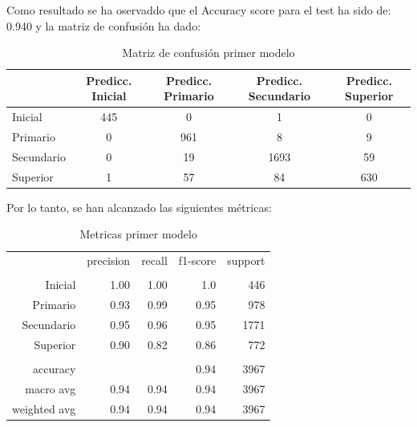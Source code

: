 \documentclass[a4paper]{article}
\begin{document}
            Como resultado se ha oservaddo que el Accuracy score para el test ha sido de: 0.940 y la matriz de confusión ha dado:
            \begin{table}[H]
                \centering
                \begin{tabular}{|l|c|c|c|c|}
                \hline
                    ~ & Predicc. Inicial & Predicc. Primario & Predicc. Secundario & Predicc. Superior \\ \hline
                    Inicial & 445 & 0 & 1 & 0 \\ \hline
                    Primario & 0 & 961 & 8 & 9 \\ \hline
                    Secundario & 0 & 19 & 1693 & 59 \\ \hline
                    Superior & 1 & 57 & 84 & 630 \\ \hline
                \end{tabular}
                \caption{Matriz de confusión primer modelo}
                \label{First model confusion matrix}
            \end{table}

            Por lo tanto, se han alcanzado las siguientes métricas:

            \begin{table}[H]
                \centering
                \begin{tabular}{rrrrr}
                    ~ & precision & recall & f1-score & support \\ 
                    & & & & \\
                    Inicial    & 1.00& 1.00 & 1.0 & 446 \\ 
                    Primario   & 0.93 & 0.99 & 0.95 & 978 \\ 
                    Secundario & 0.95 & 0.96 & 0.95 & 1771 \\ 
                    Superior   & 0.90 & 0.82 & 0.86 & 772 \\ 
                    & & & & \\
                    accuracy & & & 0.94 & 3967 \\ 
                    macro avg & 0.94 & 0.94 & 0.94 & 3967 \\ 
                    weighted avg & 0.94 & 0.94 & 0.94 & 3967 \\ 
                \end{tabular}
                \caption{Metricas primer modelo}
                \label{First model metrics}
            \end{table}
\end{document}
